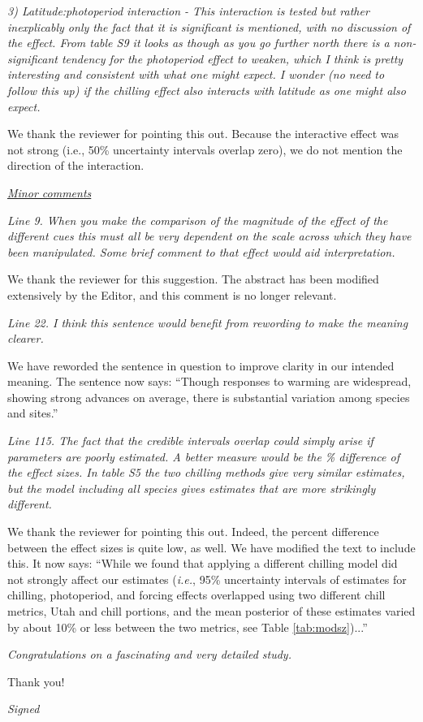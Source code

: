 \documentclass{article}
\begin{document}
\par \emph{3) Latitude:photoperiod interaction - This interaction is tested but rather inexplicably only the fact that it is significant is mentioned, with no discussion of the effect. From table S9 it looks as though as you go further north there is a non-significant tendency for the photoperiod effect to weaken, which I think is pretty interesting and consistent with what one might expect. I wonder (no need to follow this up) if the chilling effect also interacts with latitude as one might also expect.}
\par We thank the reviewer for pointing this out. Because the interactive effect was not strong (i.e., 50\% uncertainty intervals overlap zero), we do not mention the direction of the interaction.  


\underline{\emph{Minor comments}}

\emph{Line 9. When you make the comparison of the magnitude of the effect of the different cues this must all be very dependent on the scale across which they have been manipulated. Some brief comment to that effect would aid interpretation.}
\par We thank the reviewer for this suggestion. The abstract has been modified extensively by the Editor, and this comment is no longer relevant. 
\par \emph{Line 22. I think this sentence would benefit from rewording to make the meaning clearer.}
\par We have reworded the sentence in question to improve clarity in our intended meaning. The sentence now says:
``Though responses to warming are widespread, showing strong advances on average, there is substantial variation among species and sites.''
\par \emph{Line 115. The fact that the credible intervals overlap could simply arise if parameters are poorly estimated. A better measure would be the \% difference of the effect sizes. In table S5 the two chilling methods give very similar estimates, but the model including all species gives estimates that are more strikingly different.}
\par We thank the reviewer for pointing this out. Indeed, the percent difference between the effect sizes is quite low, as well. We have modified the text to include this. It now says:
``While we found that applying a different chilling model did not strongly affect our estimates (\emph{i.e.}, 95\% uncertainty intervals of estimates for chilling, photoperiod, and forcing effects overlapped using two different chill metrics, Utah and chill portions, and the mean posterior of these estimates varied by about 10\% or less between the two metrics, see Table \ref{tab:modsz})...''
\par \emph{Congratulations on a fascinating and very detailed study.}
\par Thank you!
\par \emph{Signed}
\end{document}
